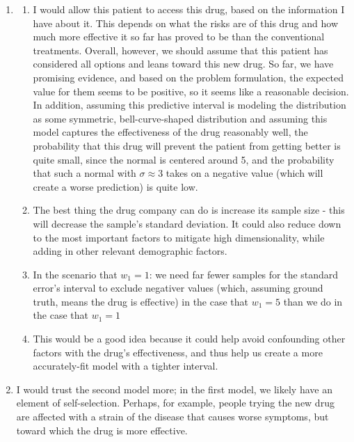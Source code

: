 \documentclass[submit]{harvardml}
\newenvironment{ans}{
  \begin{enumerate}
  \color{blue}
}{
  \end{enumerate}
  \color{black}
}
\begin{document}
\begin{ans}
\begin{enumerate}
        \item I would recommend Model B, because, as discussed above, model C poorly fit, fitting to the noise because the high dimensionality prevents it from "discerning" patterns in the data. 
    \end{enumerate}
    \item
    \begin{enumerate}
        \item I would allow this patient to access this drug, based on the information I have about it. This depends on what the risks are of this drug and how much more effective it so far has proved to be than the conventional treatments. Overall, however, we should assume that this patient has considered all options and leans toward this new drug. So far, we have promising evidence, and based on the problem formulation, the expected value for them seems to be positive, so it seems like a reasonable decision. In addition, assuming this predictive interval is modeling the distribution as some symmetric, bell-curve-shaped distribution and assuming this model captures the effectiveness of the drug reasonably well, the probability that this drug will prevent the patient from getting better is quite small, since the normal is centered around 5, and the probability that such a normal with $\sigma \approx 3$ takes on a negative value (which will create a worse prediction) is quite low. 
        \item The best thing the drug company can do is increase its sample size - this will decrease the sample's standard deviation. It could also reduce down to the most important factors to mitigate high dimensionality, while adding in other relevant demographic factors. 
        \item In the scenario that $w_1 = 1$: we need far fewer samples for the standard error's interval to exclude negativer values (which, assuming ground truth, means the drug is effective) in the case that $w_1 = 5$ than we do in the case that $w_1 = 1$
        \item This would be a good idea because it could help avoid confounding other factors with the drug's effectiveness, and thus help us create a more accurately-fit model with a tighter interval. 
    \end{enumerate}
    \item I would trust the second model more; in the first model, we likely have an element of self-selection. Perhaps, for example, people trying the new drug are affected with a strain of the disease that causes worse symptoms, but toward which the drug is more effective. 
    
\end{ans}
\newpage
\end{document}
